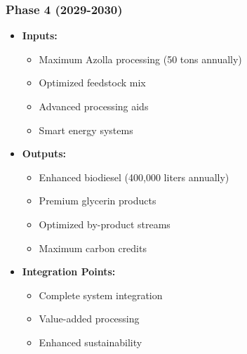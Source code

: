 \subsubsection{Phase 4 (2029-2030)}
\begin{itemize}
    \item \textbf{Inputs:}
    \begin{itemize}
        \item Maximum Azolla processing (50 tons annually)
        \item Optimized feedstock mix
        \item Advanced processing aids
        \item Smart energy systems
    \end{itemize}
    \item \textbf{Outputs:}
    \begin{itemize}
        \item Enhanced biodiesel (400,000 liters annually)
        \item Premium glycerin products
        \item Optimized by-product streams
        \item Maximum carbon credits
    \end{itemize}
    \item \textbf{Integration Points:}
    \begin{itemize}
        \item Complete system integration
        \item Value-added processing
        \item Enhanced sustainability
    \end{itemize}
\end{itemize}

